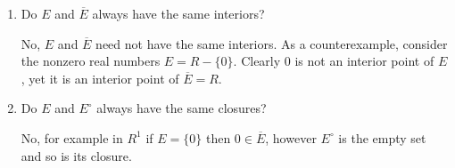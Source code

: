 \begin{enumerate}
\begin{proof}
    Next, suppose $x$ is in the closure of $E^c$. Then either $x$ is
    in $E^c$ or $x$ is a limit point of $E^c$. In the first case, $x$
    cannot be an interior point of $E$ since $x\not\in E$. In the
    second case, every neighborhood of $x$ contains a point in $E^c$,
    so $x$ is not an interior point of $E$. This shows that
    $x\not\in E^\circ$ so that $\overline{E^c} \subset
    (E^\circ)^c$. This completes the proof that
    $(E^\circ)^c = \overline{E^c}$.
  \end{proof}
\item Do $E$ and $\overline{E}$ always have the same interiors?
  \begin{solution}
    No, $E$ and $\overline{E}$ need not have the same interiors. As a
    counterexample, consider the nonzero real numbers $E = R -
    \{0\}$. Clearly $0$ is not an interior point of $E$, yet it is an
    interior point of $\overline{E} = R$.
  \end{solution}
\item Do $E$ and $E^\circ$ always have the same closures?
  \begin{solution}
    No, for example in $R^1$ if $E = \{0\}$ then $0\in\overline{E}$,
    however $E^\circ$ is the empty set and so is its closure.
  \end{solution}
\end{enumerate}

